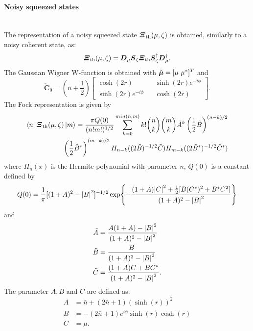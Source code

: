         \paragraph{Noisy squeezed states}\mbox{} \\
        The representation of a noisy squeezed state $\bm{\relax{\varXi}}_{\mathrm{th}}(\mu,\zeta)$ is obtained,
        similarly to a noisy coherent state, as:
        \begin{equation}
            \bm{\relax{\varXi}}_{\mathrm{th}}(\mu,\zeta)=\bm{\relax{D}}_\mu\bm{\relax{S}}_\zeta\bm{\relax{\varXi}}_{\mathrm{th}}
            \bm{\relax{S}}_\zeta^\dagger\bm{\relax{D}}_\mu^\dagger.
        \end{equation}
        The Gaussian Wigner W-function is obtained with $\check{\Vector{\mu}}=[\mu\ \mu^*]^T$ and
        \begin{equation}
            \check{\pmb{C}}_0=\left(\bar{n}+\frac{1}{2}\right)
            \begin{bmatrix}
                \cosh(2r) && \sinh(2r)e^{-i\phi}\\
                \sinh(2r)e^{-i\phi} && \cosh(2r)
            \end{bmatrix}.
            \label{eq:WignerSS}
        \end{equation}
        The Fock representation is given by \cite{MarMar_1993}
        \begin{equation}\begin{split}
            \bra{n}\bm{\relax{\varXi}}_{\mathrm{th}}(\mu,\zeta)\ket{m}=\frac{\pi Q(0)}{(n!m!)^{1/2}}
            \sum_{k=0}^{min(n,m)} k! \binom{n}{k}\binom{m}{k} \tilde{A}^k\left(\frac{1}{2}
            \tilde{B}\right)^{(n-k)/2}\\ \left(\frac{1}{2}\tilde{B}^*\right)^{(m-k)/2}
            H_{n-k}((2\tilde{B})^{-1/2}\tilde{C}) H_{m-k}((2\tilde{B}^*)^{-1/2}\tilde{C}^*) 
            \label{FR_NSS}
        \end{split}\end{equation}
        where $H_n(x)$ is the Hermite polynomial with parameter $n$, $Q(0)$ is a constant defined by
        \begin{equation}
            Q(0) = \frac{1}{\pi}[(1+A)^2-\absolutevalue{B}^2]^{-1/2}\exp{-\frac{(1+A)\absolutevalue{C}^2
            +\frac{1}{2}[B(C^*)^2+B^*C^2]}{(1+A)^2-\absolutevalue{B}^2}}
        \end{equation}
        and
        \begin{subequations}
            \begin{align}
            \tilde{A} &= \frac{A(1+A)-\absolutevalue{B}^2}{(1+A)^2-\absolutevalue{B}^2}\\
            \tilde{B} &= \frac{B}{(1+A)^2-\absolutevalue{B}^2}\\
            \tilde{C} &= \frac{(1+A)C+BC^*}{(1+A)^2-\absolutevalue{B}^2}.
            \end{align}
        \end{subequations}
        The parameter $A,B$ and $C$ are defined as:
        \begin{subequations}
            \begin{align}
            A&=\bar{n}+(2\bar{n}+1)(\sinh(r))^2\\
            B&=-(2\bar{n}+1)e^{i\phi}\sinh(r)\cosh(r)\\
            C&=\mu.
            \end{align}
        \end{subequations}